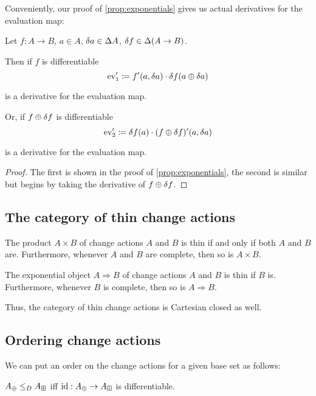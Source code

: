 Conveniently, our proof of \cref{prop:exponentials} gives us actual derivatives for the evaluation map:

\begin{prop}
\label{prop:evDerivatives}
  Let $f: A \rightarrow B$, $a \in A$, $\delta a \in
  \Delta A$, $\delta f \in \Delta (A \rightarrow B)$.

  Then if $f$ is differentiable
  $$\operatorname{ev}'_1 \coloneqq f'(a, \delta a) \cdot \delta f(a \oplus \delta a)$$

  is a derivative for the evaluation map.
  
  Or, if $f \oplus \delta f$ is differentiable
  $$\operatorname{ev}'_2 \coloneqq \delta f(a) \cdot (f \oplus \delta f)'(a, \delta a)$$

  is a derivative for the evaluation map.
\end{prop}
\ifproofs
\begin{proof}
  The first is shown in the proof of \cref{prop:exponentials}, the second is
  similar but begins by taking the derivative of $f \oplus \delta f$.
\end{proof}
\fi

\subsection{The category of thin change actions}

\begin{prop}
  The product $A \times B$ of change actions $A$ and $B$ is thin if and only if both $A$ and $B$ are.
  Furthermore, whenever $A$ and $B$ are complete, then so is $A \times B$.

  The exponential object $A \Rightarrow B$ of change actions $A$ and $B$ is thin if $B$ is. 
  Furthermore, whenever $B$ is complete, then so is $A \Rightarrow B$.
\end{prop}

Thus, the category of thin change actions is Cartesian closed as well.

\subsection{Ordering change actions}

We can put an order on the change actions for a given base set as follows:

\begin{defn}
  $A_\oplus \leq_D A_\boxplus$ iff $\textrm{id}: A_\oplus \rightarrow A_\boxplus$ is differentiable.
\end{defn}

